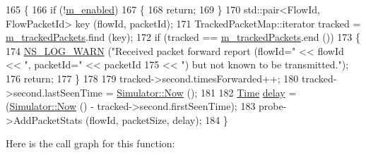 \begin{DoxyCode}
165 \{
166   \textcolor{keywordflow}{if} (!\hyperlink{classns3_1_1FlowMonitor_a26ecae1b883d6625091b07e2698f0d45}{m\_enabled})
167     \{
168       \textcolor{keywordflow}{return};
169     \}
170   std::pair<FlowId, FlowPacketId> key (flowId, packetId);
171   TrackedPacketMap::iterator tracked = \hyperlink{classns3_1_1FlowMonitor_ab4f63ca5c2a927337870110fa8233bce}{m\_trackedPackets}.find (key);
172   \textcolor{keywordflow}{if} (tracked == \hyperlink{classns3_1_1FlowMonitor_ab4f63ca5c2a927337870110fa8233bce}{m\_trackedPackets}.end ())
173     \{
174       \hyperlink{group__logging_gade7208b4009cdf0e25783cd26766f559}{NS\_LOG\_WARN} (\textcolor{stringliteral}{"Received packet forward report (flowId="} << flowId << \textcolor{stringliteral}{", packetId="} << 
      packetId
175                                                              << \textcolor{stringliteral}{") but not known to be transmitted."});
176       \textcolor{keywordflow}{return};
177     \}
178 
179   tracked->second.timesForwarded++;
180   tracked->second.lastSeenTime = \hyperlink{classns3_1_1Simulator_ac3178fa975b419f7875e7105be122800}{Simulator::Now} ();
181 
182   \hyperlink{namespacens3_1_1TracedValueCallback_a7ffd3e7c142ffe7c8a1d2db9b8de38ec}{Time} \hyperlink{lte_2model_2fading-traces_2fading__trace__generator_8m_a7964e6aa8f61a9d28973c8267a606ad8}{delay} = (\hyperlink{classns3_1_1Simulator_ac3178fa975b419f7875e7105be122800}{Simulator::Now} () - tracked->second.firstSeenTime);
183   probe->AddPacketStats (flowId, packetSize, delay);
184 \}
\end{DoxyCode}


Here is the call graph for this function\+:


